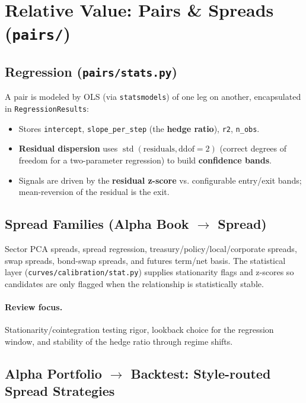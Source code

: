 \section{Relative Value: Pairs \& Spreads (\texttt{pairs/})}

\subsection{Regression (\texttt{pairs/stats.py})}

A pair is modeled by OLS (via \texttt{statsmodels}) of one leg on another, encapsulated in
\texttt{RegressionResults}:

\begin{itemize}
\item Stores \texttt{intercept}, \texttt{slope\_per\_step} (the \textbf{hedge ratio}), \texttt{r2}, \texttt{n\_obs}.
\item \textbf{Residual dispersion} uses $\operatorname{std}(\text{residuals}, \mathrm{ddof}=2)$ (correct degrees of freedom for a two-parameter regression) to build \textbf{confidence bands}.
\item Signals are driven by the \textbf{residual z-score} vs. configurable entry/exit bands; mean-reversion of the residual is the exit.
\end{itemize}

\subsection{Spread Families (Alpha Book $\rightarrow$ Spread)}

Sector PCA spreads, spread regression, treasury/policy/local/corporate spreads, swap
spreads, bond-swap spreads, and futures term/net basis. The statistical layer
(\texttt{curves/calibration/stat.py}) supplies stationarity flags and z-scores so candidates
are only flagged when the relationship is statistically stable.

\paragraph{Review focus.}
Stationarity/cointegration testing rigor, lookback choice for the regression window,
and stability of the hedge ratio through regime shifts.

\subsection{Alpha Portfolio $\rightarrow$ Backtest: Style-routed Spread Strategies}

